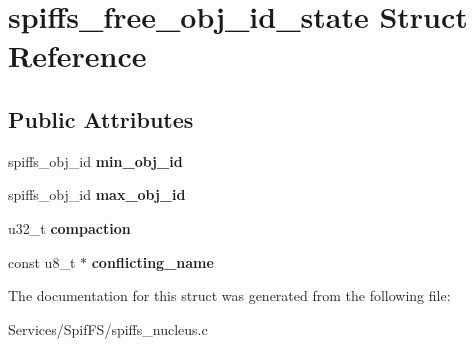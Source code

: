 \hypertarget{structspiffs__free__obj__id__state}{}\section{spiffs\+\_\+free\+\_\+obj\+\_\+id\+\_\+state Struct Reference}
\label{structspiffs__free__obj__id__state}
\subsection*{Public Attributes}
\begin{DoxyCompactItemize}
\item 
\hypertarget{structspiffs__free__obj__id__state_a2e23db65adf01c76cfb8dca971dbb565}{}spiffs\+\_\+obj\+\_\+id {\bfseries min\+\_\+obj\+\_\+id}\label{structspiffs__free__obj__id__state_a2e23db65adf01c76cfb8dca971dbb565}

\item 
\hypertarget{structspiffs__free__obj__id__state_abe3e0e24350052b8c90aed697f23b6f7}{}spiffs\+\_\+obj\+\_\+id {\bfseries max\+\_\+obj\+\_\+id}\label{structspiffs__free__obj__id__state_abe3e0e24350052b8c90aed697f23b6f7}

\item 
\hypertarget{structspiffs__free__obj__id__state_a4fe8c12907b7d0909f3ab4aa96a2fa42}{}u32\+\_\+t {\bfseries compaction}\label{structspiffs__free__obj__id__state_a4fe8c12907b7d0909f3ab4aa96a2fa42}

\item 
\hypertarget{structspiffs__free__obj__id__state_a570a92aa2ae0ad99eaa0d15e872ca650}{}const u8\+\_\+t $\ast$ {\bfseries conflicting\+\_\+name}\label{structspiffs__free__obj__id__state_a570a92aa2ae0ad99eaa0d15e872ca650}

\end{DoxyCompactItemize}


The documentation for this struct was generated from the following file\+:\begin{DoxyCompactItemize}
\item 
Services/\+Spif\+F\+S/spiffs\+\_\+nucleus.\+c\end{DoxyCompactItemize}
